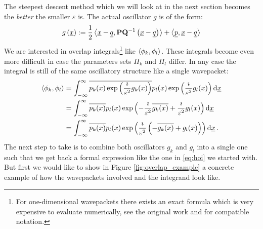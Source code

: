 \documentclass[a4paper,10pt]{article}
\begin{document}
The steepest descent method which we will look at in the next section becomes
the \emph{better} the smaller $\varepsilon$ is. The actual oscillator $g$ is of the form:
\begin{equation}
  g\left(\underline{x}\right)
  :=
  \frac{1}{2} \left\langle \underline{x}-\underline{q} , \mathbf{P}\mathbf{Q}{}^{-1} \left(\underline{x}-\underline{q}\right) \right\rangle
  +
  \left\langle \underline{p} , \underline{x}-\underline{q} \right\rangle
\end{equation}
We are interested in overlap integrals\footnote{For one-dimensional wavepackets there
exists an exact formula which is very expensive to evaluate numerically, see the original work
\cite{H_R_quantization_rules} and \cite{B_bachelor_thesis} for compatible notation.} like
$\left\langle \phi_k , \phi_l \right\rangle$. These integrals become even more difficult in case the parameters
sets $\Pi_k$ and $\Pi_l$ differ. In any case the integral is still of the same oscillatory
structure like a single wavepacket:
\begin{equation}
\begin{split}
  \left\langle \phi_k , \phi_l \right\rangle & =
  \int_{-\infty}^{\infty} \overline{p_k(x)\exp\left(\frac{\imath}{\varepsilon^2} g_k(x)\right)}
                                p_l(x)\exp\left(\frac{\imath}{\varepsilon^2} g_l(x)\right)
  \mathrm{d}\underline{x} \\
  & =
  \int_{-\infty}^{\infty}
    \overline{p_k(x)} p_l(x)
    \exp\left(-\frac{\imath}{\varepsilon^2} \overline{g_k(x)} + \frac{\imath}{\varepsilon^2} g_l(x)\right)
  \mathrm{d}\underline{x} \\
  & =
  \int_{-\infty}^{\infty}
    \overline{p_k(x)} p_l(x)
    \exp\left(\frac{\imath}{\varepsilon^2}\left(-\overline{g_k(x)} + g_l(x)\right)\right)
  \mathrm{d}\underline{x} \,.
\end{split}
\end{equation}
The next step to take is to combine both oscillators $g_k$ and $g_l$ into a
single one such that we get back a formal expression like the one in
\eqref{eq:hoi} we started with. But first we would like to
show in Figure \ref{fig:overlap_example} a concrete example of how the
wavepackets involved and the integrand look like.
\end{document}
